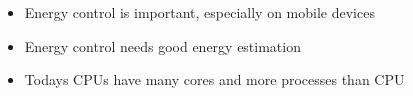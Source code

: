 
\begin{itemize}

\item Energy control is important, especially on mobile devices

\item Energy control needs good energy estimation

\item Todays CPUs have many cores and more processes than CPU

\end{itemize}

